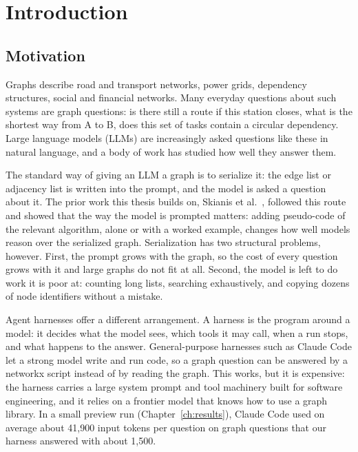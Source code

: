 \chapter{Introduction}
\label{ch:intro}

\section{Motivation}

Graphs describe road and transport networks, power grids, dependency structures, social and financial networks.
Many everyday questions about such systems are graph questions: is there still a route if this station closes, what
is the shortest way from A to B, does this set of tasks contain a circular dependency. Large language models (LLMs)
are increasingly asked questions like these in natural language, and a body of work has studied how well they answer
them.

The standard way of giving an LLM a graph is to serialize it: the edge list or adjacency list is written into the
prompt, and the model is asked a question about it. The prior work this thesis builds on, Skianis et al.\
\cite{skianis2024pseudocode}, followed this route and showed that the way the model is prompted matters: adding
pseudo-code of the relevant algorithm, alone or with a worked example, changes how well models reason over the
serialized graph. Serialization has two structural problems, however. First, the prompt grows with the graph, so the
cost of every question grows with it and large graphs do not fit at all. Second, the model is left to do work it is
poor at: counting long lists, searching exhaustively, and copying dozens of node identifiers without a mistake.

Agent harnesses offer a different arrangement. A harness is the program around a model: it decides what the model
sees, which tools it may call, when a run stops, and what happens to the answer. General-purpose harnesses such as
Claude Code \cite{claudecode} let a strong model write and run code, so a graph question can be answered by a
networkx \cite{networkx} script instead of by reading the graph. This works, but it is expensive: the harness carries
a large system prompt and tool machinery built for software engineering, and it relies on a frontier model that
knows how to use a graph library. In a small preview run (Chapter~\ref{ch:results}), Claude Code used on average about
41,900 input tokens per question on graph questions that our harness answered with about 1,500.

